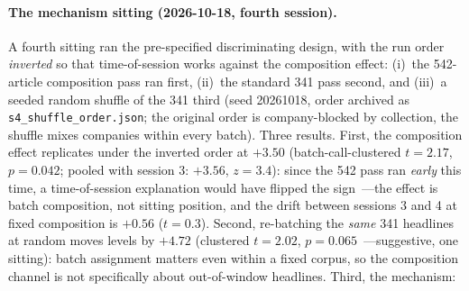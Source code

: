 \paragraph{The mechanism sitting (2026-10-18, fourth session).} A fourth sitting ran the pre-specified discriminating design, with the run order \emph{inverted} so that time-of-session works against the composition effect: (i)~the 542-article composition pass ran first, (ii)~the standard 341 pass second, and (iii)~a seeded random shuffle of the 341 third (seed 20261018, order archived as \texttt{s4\_shuffle\_order.json}; the original order is company-blocked by collection, the shuffle mixes companies within every batch). Three results. First, the composition effect replicates under the inverted order at $+3.50$ (batch-call-clustered $t=2.17$, $p=0.042$; pooled with session 3: $+3.56$, $z=3.4$): since the 542 pass ran \emph{early} this time, a time-of-session explanation would have flipped the sign~---the effect is batch composition, not sitting position, and the drift between sessions 3 and 4 at fixed composition is $+0.56$ ($t=0.3$). Second, re-batching the \emph{same} 341 headlines at random moves levels by $+4.72$ (clustered $t=2.02$, $p=0.065$~---suggestive, one sitting): batch assignment matters even within a fixed corpus, so the composition channel is not specifically about out-of-window headlines. Third, the mechanism:


